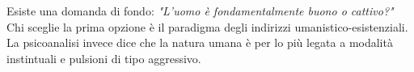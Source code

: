 \documentclass{subfiles}
\begin{document}
Esiste una domanda di fondo: \textit{"L'uomo è fondamentalmente buono o cattivo?"} Chi sceglie la prima opzione è il
paradigma degli indirizzi umanistico-esistenziali. La psicoanalisi invece dice che la natura umana è per lo più legata a
modalità instintuali e pulsioni di tipo aggressivo.
\end{document}
